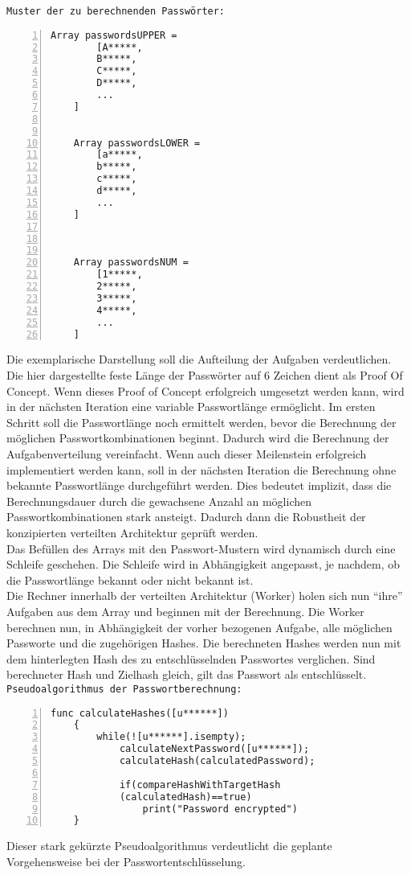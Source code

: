 \texttt{Muster der zu berechnenden Passwörter:}
\begin{lstlisting}[basicstyle=\ttfamily,numbers=left,numberstyle=\footnotesize\ttfamily,backgroundcolor=\color{sourcegray}]
	Array passwordsUPPER = 
		[A*****,
	 	B*****,
	 	C*****,
	 	D*****,
	 	...
	]
	
	
	Array passwordsLOWER = 
		[a*****,
	 	b*****,
	 	c*****,
	 	d*****,
		...
	]
	
	

	Array passwordsNUM = 
		[1*****,
	 	2*****,
	 	3*****,
	 	4*****,
		...
	]
\end{lstlisting}

Die exemplarische Darstellung soll die Aufteilung der Aufgaben verdeutlichen. Die hier dargestellte feste Länge der Passwörter auf 6 Zeichen dient als Proof Of Concept. Wenn dieses Proof of Concept erfolgreich umgesetzt werden kann, wird in der nächsten Iteration eine variable Passwortlänge ermöglicht. Im ersten Schritt soll die Passwortlänge noch ermittelt werden, bevor die Berechnung der möglichen Passwortkombinationen beginnt. Dadurch wird die Berechnung der Aufgabenverteilung vereinfacht. Wenn auch dieser Meilenstein erfolgreich implementiert werden kann, soll in der nächsten Iteration die Berechnung ohne bekannte Passwortlänge durchgeführt werden. Dies bedeutet implizit, dass die Berechnungsdauer durch die gewachsene Anzahl an möglichen Passwortkombinationen stark ansteigt. Dadurch dann die Robustheit der konzipierten verteilten Architektur geprüft werden. \\

Das Befüllen des Arrays mit den Passwort-Mustern wird dynamisch durch eine Schleife geschehen. Die Schleife wird in Abhängigkeit angepasst, je nachdem, ob die Passwortlänge bekannt oder nicht bekannt ist. \\
Die Rechner innerhalb der verteilten Architektur (Worker) holen sich nun \enquote{ihre} Aufgaben aus dem Array und beginnen mit der Berechnung. Die Worker berechnen nun, in Abhängigkeit der vorher bezogenen Aufgabe, alle möglichen Passworte und die zugehörigen Hashes. Die berechneten Hashes werden nun mit dem hinterlegten Hash des zu entschlüsselnden Passwortes verglichen. Sind berechneter Hash und Zielhash gleich, gilt das Passwort als entschlüsselt. \\

\texttt{Pseudoalgorithmus der Passwortberechnung:}
\begin{lstlisting}[basicstyle=\ttfamily,numbers=left,numberstyle=\footnotesize\ttfamily,backgroundcolor=\color{sourcegray}]
	func calculateHashes([u******])
	{
		while(![u******].isempty);
			calculateNextPassword([u******]);
			calculateHash(calculatedPassword);
						
			if(compareHashWithTargetHash
			(calculatedHash)==true)
				print("Password encrypted")
	}
\end{lstlisting}

Dieser stark gekürzte Pseudoalgorithmus verdeutlicht die geplante Vorgehensweise bei der Passwortentschlüsselung. \\


